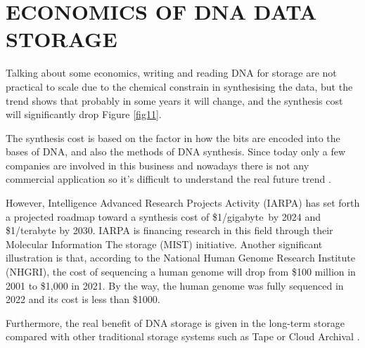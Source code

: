 \documentclass[10pt,twocolumn,twoside]{gsajnl}
\theoremstyle{definition}
\begin{document}
\section{ECONOMICS OF DNA DATA STORAGE}
Talking about some economics, writing and reading DNA for storage are not practical to scale due to the chemical constrain in synthesising the data, but the trend shows that probably in some years it will change, and the synthesis cost will significantly drop Figure \ref{fig11}.

The synthesis cost is based on the factor in how the bits are encoded into the bases of DNA, and also the methods of DNA synthesis. Since today only a few companies are involved in this business and nowadays there is not any commercial application so it's difficult to understand the real future trend \cite{alliance2021preserving}.

However, Intelligence Advanced Research Projects Activity (IARPA) has set forth a projected roadmap toward a synthesis cost of \$1/gigabyte by 2024 and \$1/terabyte by 2030. IARPA is financing research in this field through their Molecular Information The storage (MIST) initiative.
Another significant illustration is that, according to the National Human Genome Research Institute (NHGRI), the cost of sequencing a human genome will drop from \$100 million in 2001 to \$1,000 in 2021. 
By the way, the human genome was fully sequenced in 2022 and its cost is less than \$1000.

Furthermore, the real benefit of DNA storage is given in the long-term storage compared with other traditional storage systems such as Tape or Cloud Archival \cite{rosenthal2012economics}.
\end{document}

